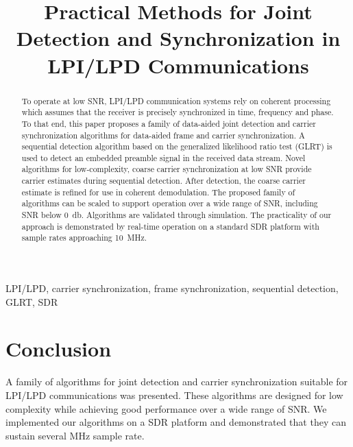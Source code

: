 \documentclass[10pt,final,conference,comsoc]{IEEEtran}
\begin{document}
\title{Practical Methods for Joint Detection and Synchronization in
  LPI/LPD Communications}
\author{
}

\maketitle

\begin{abstract}
  To operate at low SNR, LPI/LPD communication systems rely on
  coherent processing which assumes that the receiver is precisely
  synchronized in time, frequency and phase. 
  To that end, this paper proposes a family of data-aided joint
  detection and carrier synchronization algorithms for data-aided
  frame and carrier synchronization.
  A sequential detection algorithm based on the generalized likelihood ratio test (GLRT)
  is used to detect an embedded preamble signal in the received data
  stream.
  Novel algorithms for low-complexity, coarse carrier synchronization
  at low SNR provide carrier estimates
  during sequential detection.
  After detection,
  the coarse carrier estimate is refined for use in coherent demodulation.
  The proposed family of algorithms can be scaled to support operation
  over a wide range of SNR, including SNR below \SI{0}{\decibel}.
  Algorithms are validated through simulation.
  The practicality of our approach is demonstrated by real-time operation on
  a standard SDR platform with sample rates approaching
  \SI{10}{\mega\hertz}.
\end{abstract}

\begin{IEEEkeywords}
LPI/LPD, carrier synchronization, frame synchronization, sequential
detection, GLRT, SDR
\end{IEEEkeywords}













\section{Conclusion}

A family of algorithms for joint detection and carrier synchronization
suitable for LPI/LPD communications was presented.
These algorithms are designed for low complexity while achieving good
performance over a wide range of SNR.\@
We implemented our algorithms on a SDR platform and demonstrated that
they can sustain several \si{\mega\hertz} sample rate.



\end{document}
